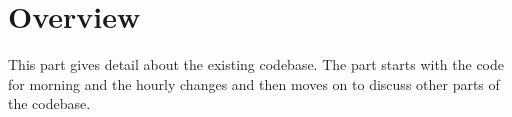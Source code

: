 \section{Overview}

This part gives detail about the existing codebase. The part starts with the code for morning and the hourly changes and then moves on to discuss other parts of the codebase.